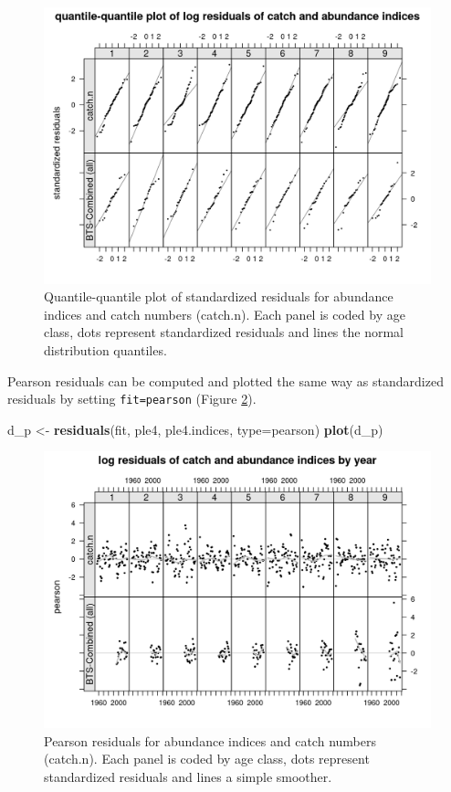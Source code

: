 \documentclass[
]{book}
\newenvironment{Shaded}{\begin{snugshade}}{\end{snugshade}}
\newcommand{\AttributeTok}[1]{\textcolor[rgb]{0.13,0.29,0.53}{#1}}
\newcommand{\FunctionTok}[1]{\textcolor[rgb]{0.13,0.29,0.53}{\textbf{#1}}}
\newcommand{\NormalTok}[1]{#1}
\newcommand{\OtherTok}[1]{\textcolor[rgb]{0.56,0.35,0.01}{#1}}
\newcommand{\StringTok}[1]{\textcolor[rgb]{0.31,0.60,0.02}{#1}}
\begin{document}
\begin{figure}
\centering
\includegraphics{_bookdown_files/_main_files/figure-html/qq-1.png}
\caption{\label{fig:qq}Quantile-quantile plot of standardized residuals for abundance indices and catch numbers (catch.n). Each panel is coded by age class, dots represent standardized residuals and lines the normal distribution quantiles.}
\end{figure}

Pearson residuals can be computed and plotted the same way as standardized residuals by setting \texttt{fit=\textquotesingle{}pearson\textquotesingle{}} (Figure \ref{fig:resp}).

\begin{Shaded}
\begin{Highlighting}[]
\NormalTok{d\_p }\OtherTok{\textless{}{-}} \FunctionTok{residuals}\NormalTok{(fit, ple4, ple4.indices, }\AttributeTok{type=}\StringTok{\textquotesingle{}pearson\textquotesingle{}}\NormalTok{)}
\FunctionTok{plot}\NormalTok{(d\_p)}
\end{Highlighting}
\end{Shaded}

\begin{figure}
\centering
\includegraphics{_bookdown_files/_main_files/figure-html/resp-1.png}
\caption{\label{fig:resp}Pearson residuals for abundance indices and catch numbers (catch.n). Each panel is coded by age class, dots represent standardized residuals and lines a simple smoother.}
\end{figure}
\end{document}
